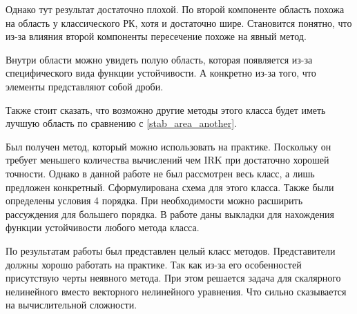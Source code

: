 \documentclass[a4paper,article,14pt]{extarticle}
\begin{document}
Однако тут результат достаточно плохой. По второй компоненте область похожа на область у классического РК, хотя и достаточно шире. Становится понятно, что из-за влияния второй компоненты пересечение похоже на явный метод.

Внутри области можно увидеть полую область, которая появляется из-за специфического вида функции устойчивости. А конкретно из-за того, что элементы представляют собой дроби.

Также стоит сказать, что возможно другие методы этого класса будет иметь лучшую область по сравнению с \ref{stab_area_another}.
\pagebreak


Был получен метод, который можно использовать на практике. Поскольку он требует меньшего количества вычислений чем IRK при достаточно хорошей точности. Однако в данной работе не был рассмотрен весь класс, а лишь предложен конкретный. Сформулирована схема для этого класса. Также были определены условия 4 порядка. При необходимости можно расширить рассуждения для большего порядка. В работе даны выкладки для нахождения функции устойчивости любого метода класса.
\pagebreak

По результатам работы был представлен целый класс методов. Представители должны хорошо работать на практике. Так как из-за его особенностей присутствую черты неявного метода. При этом решается задача для скалярного нелинейного вместо векторного нелинейного уравнения. Что сильно сказывается на вычислительной сложности.
\pagebreak
\end{document}
